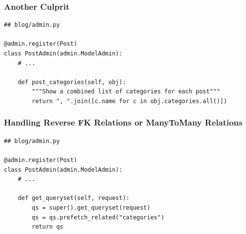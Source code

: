 \documentclass[aspectratio=169]{beamer}
\begin{document}
\begin{frame}[fragile]
\frametitle{Another Culprit}

{\tiny
\begin{verbatim}
## blog/admin.py

@admin.register(Post)
class PostAdmin(admin.ModelAdmin):
    # ...

    def post_categories(self, obj):
        """Show a combined list of categories for each post"""
        return ", ".join([c.name for c in obj.categories.all()])
\end{verbatim}
}

\end{frame}


\begin{frame}[fragile]
\frametitle{Handling Reverse FK Relations or ManyToMany Relations}

{\tiny
\begin{verbatim}
## blog/admin.py

@admin.register(Post)
class PostAdmin(admin.ModelAdmin):
    # ...

    def get_queryset(self, request):
        qs = super().get_queryset(request)
        qs = qs.prefetch_related("categories")
        return qs
\end{verbatim}
}

\end{frame}


\begin{frame}
  \begin{figure}[p]
    \centering
  \end{figure}
\end{frame}


\end{document}
